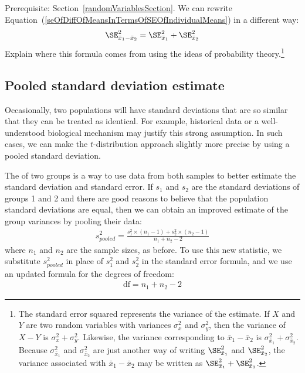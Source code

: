 {\begin{exercise}\label{derivingSEForDiffOfTwoMeansExercise}
Prerequisite: Section~\ref{randomVariablesSection}.
We can rewrite Equation~(\ref{seOfDiffOfMeansInTermsOfSEOfIndividualMeans}) in a different way:
\begin{eqnarray*}
\SE_{\bar{x}_{1} - \bar{x}_{2}}^2 = \SE_{\bar{x}_1}^2 + \SE_{\bar{x}_2}^2
\end{eqnarray*}
Explain where this formula comes from using the ideas of probability theory.\footnote{The standard error squared represents the variance of the estimate. If $X$ and $Y$ are two random variables with variances $\sigma_x^2$ and $\sigma_y^2$, then the variance of $X-Y$ is $\sigma_x^2 + \sigma_y^2$. Likewise, the variance corresponding to $\bar{x}_1 - \bar{x}_2$ is $\sigma_{\bar{x}_1}^2 + \sigma_{\bar{x}_2}^2$. Because $\sigma_{\bar{x}_1}^2$ and $\sigma_{\bar{x}_2}^2$ are just another way of writing $\SE_{\bar{x}_1}^2$ and  $\SE_{\bar{x}_2}^2$, the variance associated with $\bar{x}_1 - \bar{x}_2$ may be written as $\SE_{\bar{x}_1}^2 + \SE_{\bar{x}_2}^2$.}
\end{exercise}


\subsection{Pooled standard deviation estimate}
\label{pooledStandardDeviations}

Occasionally, two populations will have standard deviations that are so similar that they can be treated as identical. For example, historical data or a well-understood biological mechanism may justify this strong assumption. In such cases, we can make the $t$-distribution approach slightly more precise by using a pooled standard deviation.

The  of two groups is a way to use data from both samples to better estimate the standard deviation and standard error. If $s_1^{}$ and $s_2^{}$ are the standard deviations of groups 1 and 2 and there are good reasons to believe that the population standard deviations are equal, then we can obtain an improved estimate of the group variances by pooling their data:
\begin{align*}
s_{pooled}^2 = \frac{s_1^2\times (n_1-1) + s_2^2\times (n_2-1)}{n_1 + n_2 - 2}
\end{align*}
where $n_1$ and $n_2$ are the sample sizes, as before. To use this new statistic, we substitute $s_{pooled}^2$ in place of $s_1^2$ and $s_2^2$ in the standard error formula, and we use an updated formula for the degrees of freedom:
\begin{align*}
\text{df} = n_1 + n_2 - 2
\end{align*}

}
